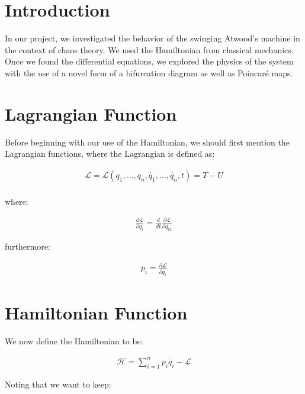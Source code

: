 \documentclass{article}
\title{\Huge{\sc{Swinging Atwood's \\ Machine}}}
\author{Michael Kister,  Alli Behr}
\date{}
\begin{document}
\maketitle

\section*{Introduction}

In our project, we investigated the behavior of the swinging Atwood's machine in the context of chaos theory.  We used the Hamiltonian from classical mechanics.  Once we found the differential equations, we explored the physics of the system with the use of a novel form of a bifurcation diagram as well as Poincar\'e maps.

\section*{Lagrangian Function}

Before beginning with our use of the Hamiltonian, we should first mention the Lagrangian functions, where the Lagrangian is defined as:

\begin{gather*}
\mathscr{L} = \mathscr{L}(q_{1}, \ldots, q_{n}, \dot{q_{1}}, \ldots, \dot{q_{n}}, t) = T - U \\
\end{gather*}

where:

\begin{gather*}
\frac{\partial \mathscr{L}}{\partial q_{i}} = \frac{d}{dt}\frac{\partial \mathscr{L}}{\partial \dot{q_{ix}}}
\end{gather*}

furthermore:

\begin{gather*}
p_{i} = \frac{\partial \mathscr{L}}{\partial \dot{q_{i}}}
\end{gather*}

\section*{Hamiltonian Function}

We now define the Hamiltonian to be:

\begin{gather*}
\mathscr{H} = \sum_{i = 1}^{n}p_{i}\dot{q_{i}} - \mathscr{L}
\end{gather*}

Noting that we want to keep:
\end{document}
